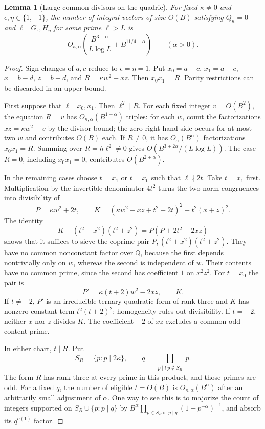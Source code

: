 \documentclass[11pt]{article}
\newtheorem{lemma}[theorem]{Lemma}
\theoremstyle{definition}
\theoremstyle{remark}
\begin{document}
\begin{lemma}[Large common divisors on the quadric]\label{lem:v5-large-sieve}
For fixed $\kappa\ne0$ and $\epsilon,\eta\in\{1,-1\}$, the number of
integral vectors of size $O(B)$ satisfying $Q_\kappa=0$ and
$\ell\mid G_\epsilon,H_\eta$ for some prime $\ell>L$ is
\begin{equation}\label{eq:v5-large-sieve}
 O_{\kappa,\alpha}\left(
    \frac{B^{3+\alpha}}{L\log L}+B^{11/4+\alpha}\right)
 \qquad(\alpha>0).
\end{equation}
\end{lemma}
\begin{proof}
Sign changes of $a,c$ reduce to $\epsilon=\eta=1$.
Put $x_0=a+c$, $x_1=a-c$, $x=b-d$, $z=b+d$, and
$R=\kappa w^2-xz$. Then $x_0x_1=R$.
Parity restrictions can be discarded in an upper bound.

First suppose that $\ell\mid x_0,x_1$. Then $\ell^2\mid R$.
For each fixed integer $v=O(B^2)$, the equation $R=v$ has
$O_{\kappa,\alpha}(B^{1+\alpha})$ triples: for each $w$, count the
factorizations $xz=\kappa w^2-v$ by the divisor bound; the zero right-hand
side occurs for at most two $w$ and contributes $O(B)$ each.
If $R\ne0$, it has $O_\alpha(B^\alpha)$ factorizations $x_0x_1=R$.
Summing over $R=h\ell^2\ne0$ gives
$O(B^{3+2\alpha}/(L\log L))$.
The case $R=0$, including $x_0x_1=0$, contributes $O(B^{2+\alpha})$.

In the remaining cases choose $t=x_1$ or $t=x_0$ such that $\ell\nmid2t$.
Take $t=x_1$ first. Multiplication by the invertible denominator $4t^2$
turns the two norm congruences into divisibility of
\[
 P=\kappa w^2+2t,\qquad
 K=(\kappa w^2-xz+t^2+2t)^2+t^2(x+z)^2.
\]
The identity
\[
 K-(t^2+x^2)(t^2+z^2)=P(P+2t^2-2xz)
\]
shows that it suffices to sieve the coprime pair
$P,(t^2+x^2)(t^2+z^2)$. They have no common nonconstant factor over
$\mathbb Q$, because the first depends nontrivially only on $w$, whereas
the second is independent of $w$. Their contents have no common prime,
since the second has coefficient $1$ on $x^2z^2$.
For $t=x_0$ the pair is
\[
 P'=\kappa(t+2)w^2-2xz,\qquad K.
\]
If $t\ne-2$, $P'$ is an irreducible ternary quadratic form of rank three
and $K$ has nonzero constant term $t^2(t+2)^2$; homogeneity rules out
divisibility. If $t=-2$, neither $x$ nor $z$ divides $K$.
The coefficient $-2$ of $xz$ excludes a common odd content prime.

In either chart, $t\mid R$. Put
\[
 S_R=\{p:p\mid2\kappa\},\qquad
 q=\prod_{\substack{p\mid t\ p\notin S_R}}p.
\]
The form $R$ has rank three at every prime in this product, and those primes
are odd. For a fixed $q$, the number of eligible $t=O(B)$ is
$O_{\kappa,\alpha}(B^\alpha)$ after an arbitrarily small adjustment of
$\alpha$. One way to see this is to majorize the count of integers
supported on $S_R\cup\{p:p\mid q\}$ by
$B^\alpha\prod_{p\in S_R\ \text{or}\ p\mid q}(1-p^{-\alpha})^{-1}$,
and absorb its $q^{o(1)}$ factor.


\end{proof}
\end{document}

